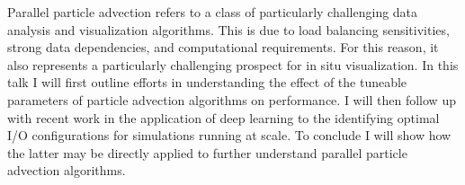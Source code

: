 \license


Parallel particle advection refers to a class of particularly challenging data analysis and visualization algorithms. This is due to load balancing sensitivities, strong data dependencies, and computational requirements. For this reason, it also represents a particularly challenging prospect for in situ visualization. In this talk I will first outline efforts in understanding the effect of the tuneable parameters of particle advection algorithms on performance. I will then follow up with recent work in the application of deep learning to the identifying optimal I/O configurations for simulations running at scale. To conclude I will show how the latter may be directly applied to further understand parallel particle advection algorithms.

